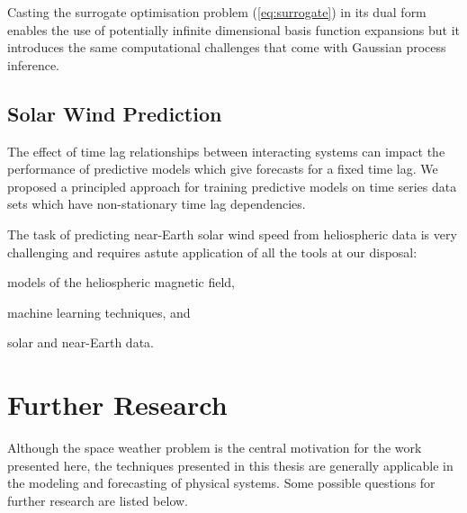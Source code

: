 Casting the surrogate optimisation problem (\cref{eq:surrogate}) in its dual form enables the use 
of potentially infinite dimensional basis function expansions but it introduces the same 
computational challenges that come with Gaussian process inference. 

\subsection*{Solar Wind Prediction}

The effect of time lag relationships between interacting systems can impact the performance of 
predictive models which give forecasts for a fixed time lag. We proposed a principled approach for 
training predictive models on time series data sets which have non-stationary time lag dependencies.

The task of predicting near-Earth solar wind speed from heliospheric data is very challenging and 
requires astute application of all the tools at our disposal: 
\begin{enumerate*} 
    \item models of the heliospheric magnetic field,
    \item machine learning techniques, and 
    \item solar and near-Earth data. 
\end{enumerate*}


\section{Further Research}

Although the space weather problem is the central motivation for the work presented here, the 
techniques presented in this thesis are generally applicable in the modeling and forecasting of 
physical systems. Some possible questions for further research are listed below.

